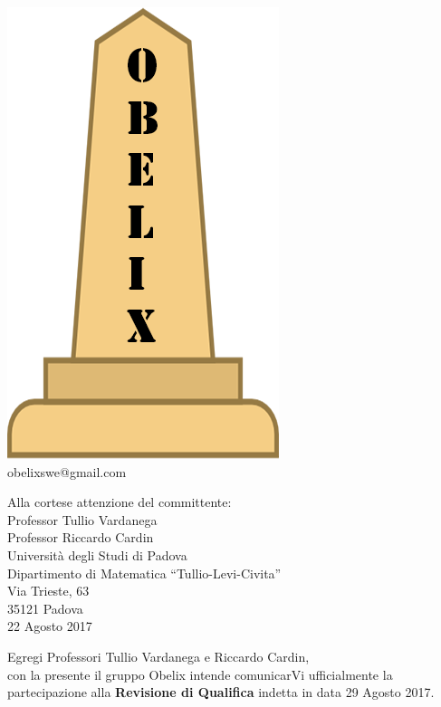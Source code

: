 \documentclass[10 pt,a4paper]{article}
\begin{document}
\begin{minipage}[adjusting]{.3\textwidth}
  \begin{centering}
    \includegraphics[width=.5\textwidth]{../../file_comuni/immagini/obelisk_sample_02.png}
    \\
    obelixswe@gmail.com
  \end{centering}
\end{minipage}


\begin{flushright}
  Alla cortese attenzione del committente: \\
\vspace{0.08in}
  Professor Tullio Vardanega \\
  Professor Riccardo Cardin \\
  Università degli Studi di Padova \\
  Dipartimento di Matematica ``Tullio-Levi-Civita''\\
  Via Trieste, 63 \\
  35121 Padova \\
\vspace{0.08in}
  22 Agosto 2017 \\
\end{flushright}
\vspace{0.1in}
Egregi Professori Tullio Vardanega e Riccardo Cardin,\\
con la presente il gruppo Obelix intende comunicarVi ufficialmente
la partecipazione alla \textbf{Revisione di Qualifica} indetta in
data 29 Agosto 2017.
\vspace{.05in}
\end{document}

